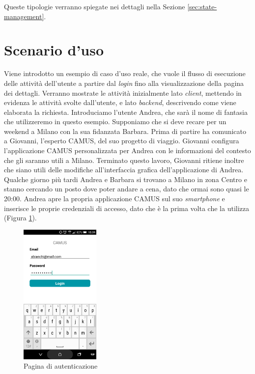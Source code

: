 Queste tipologie verranno spiegate nei dettagli nella Sezione \ref{sec:state-management}.

\section{Scenario d'uso}
Viene introdotto un esempio di caso d'uso reale, che vuole il flusso di esecuzione delle attività dell'utente a partire dal \emph{login} fino alla visualizzazione della pagina dei dettagli. Verranno mostrate le attività inizialmente lato \emph{client}, mettendo in evidenza le attività svolte dall’utente, e lato \emph{backend}, descrivendo come viene elaborata la richiesta.
Introduciamo l'utente Andrea, che sarà il nome di fantasia che utilizzeremo in questo esempio. Supponiamo che si deve recare per un weekend a Milano con la sua fidanzata Barbara. Prima di partire ha comunicato a Giovanni, l’esperto CAMUS, del suo progetto di viaggio. Giovanni configura l’applicazione CAMUS personalizzata per Andrea con le informazioni del contesto che gli saranno utili a Milano. Terminato questo lavoro, Giovanni ritiene inoltre che siano utili delle modifiche all'interfaccia grafica dell'applicazione di Andrea.
Qualche giorno più tardi Andrea e Barbara si trovano a Milano in zona Centro e stanno cercando un posto dove poter andare a cena, dato che ormai sono quasi le 20:00. Andrea apre la propria applicazione CAMUS sul suo \textit{smartphone} e inserisce le proprie credenziali di accesso, dato che è la prima volta che la utilizza (Figura \ref{fig:usecase-login}). 

\begin{figure}[H]
	\centering
	\includegraphics[width=0.35\textwidth]{4-progettazione-alto-livello/Immagini/login_caso_d'uso.png}
	\caption{Pagina di autenticazione}\label{fig:usecase-login}
\end{figure}


